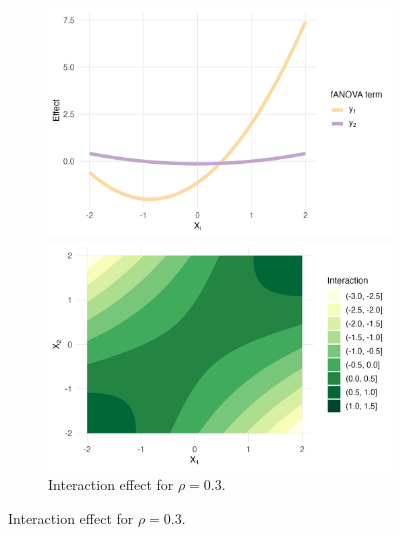 \begin{figure}[htpb]
    \centering

    \begin{subfigure}[t]{\textwidth}
        \centering
        \begin{minipage}[t]{0.49\textwidth}
            \centering
            \includegraphics[width=\textwidth]{images/experiment_section/full_a1p20_a2p00_a11p10_a22p00_a12p05_rhop03_main.png}
            \caption{Main effect for $\rho = 0.3$.}
        \end{minipage}%
        \hfill
        \begin{minipage}[t]{0.49\textwidth}
            \centering
            \includegraphics[width=\textwidth]{images/experiment_section/full_a1p20_a2p00_a11p10_a22p00_a12p05_rhop03_interaction.png}
            \caption{Interaction effect for $\rho = 0.3$.}
        \end{minipage}
    \end{subfigure}


\end{figure}
